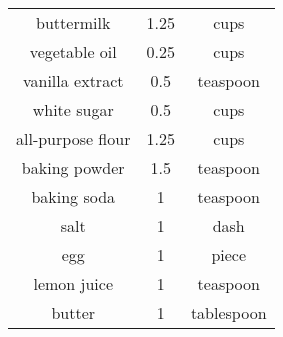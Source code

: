 \documentclass[12pt]{article}
\begin{document}
\centering

\begin{tabular}{|c|c|c|}
\hline
buttermilk & 1.25 & cups \\
vegetable oil & 0.25 & cups \\
vanilla extract & 0.5 & teaspoon \\
white sugar & 0.5 & cups \\
all-purpose flour & 1.25 & cups \\
baking powder & 1.5 & teaspoon \\
baking soda & 1 & teaspoon \\
salt & 1 & dash \\
egg & 1 & piece \\
lemon juice & 1 & teaspoon \\
butter & 1 & tablespoon \\
\hline
\end{tabular}
\end{document}
